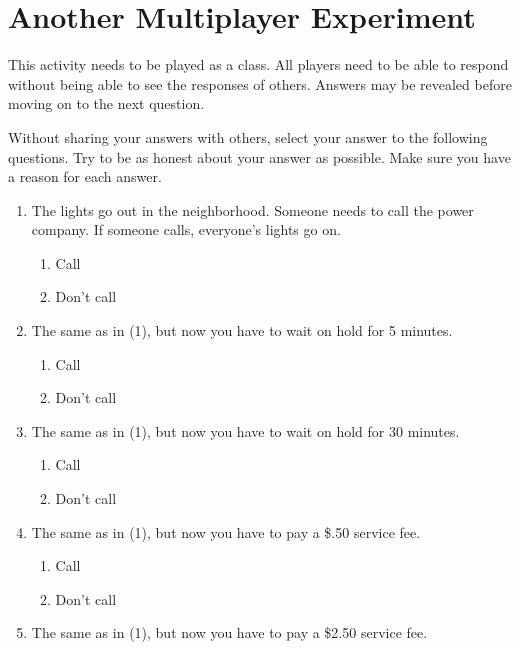 
\section{Another Multiplayer Experiment}

This activity needs to be played as a class. All players need to be able to respond without being able to see the responses of others. Answers may be revealed before moving on to the next question.

Without sharing your answers with others, select your answer to the following questions. Try to be as honest about your answer as possible.  Make sure you have a reason for each answer.

\begin{enumerate}
\item The lights go out in the neighborhood. Someone needs to call the power company. If someone calls, everyone's lights go on.

\begin{enumerate}
\item Call
\item Don't call
\end{enumerate}

\item The same as in (1), but now you have to wait on hold for 5 minutes.

\begin{enumerate}
\item Call
\item Don't call
\end{enumerate}

\item The same as in (1), but now you have to wait on hold for 30 minutes.

\begin{enumerate}
\item Call
\item Don't call
\end{enumerate}

\item The same as in (1), but now you have to pay a \$.50 service fee.

\begin{enumerate}
\item Call
\item Don't call
\end{enumerate}

\item The same as in (1), but now you have to pay a \$2.50 service fee.


\end{enumerate}
